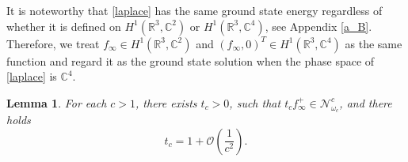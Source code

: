 \documentclass{amsart}
\theoremstyle{plain}
\newtheorem{lemma}[theorem]{Lemma}
\theoremstyle{definition}
\theoremstyle{remark}
\numberwithin{equation}{section} \numberwithin{figure}{section}
\begin{document}
It is noteworthy that \eqref{laplace} has the
 same ground state energy regardless of whether it is defined on 
 $H^{1}(\mathbb{R}^3, \mathbb{C}^2)$ or $H^{1}(\mathbb{R}^3, \mathbb{C}^4)$, see Appendix \ref{a_B}. 
 Therefore, we treat $f_\infty\in H^1(\mathbb{R}^3, \mathbb{C}^2)$ and $(f_\infty,0)^T\in H^{1}(\mathbb{R}^3, \mathbb{C}^4)$ as the same function 
 and regard
 it as the ground state solution when the phase space of \eqref{laplace} is $\mathbb{C}^4$.
\begin{lemma}\label{Lem:A2}
	For each $c>1$, there exists $t_c>0$, such that
	$t_cf_\infty^+\in\mathcal{N}^c_{\omega_c}$, and there holds
    $$ t_c=1+ \mathcal{O}(\frac{1}{c^2}).$$
\end{lemma}
\end{document}
